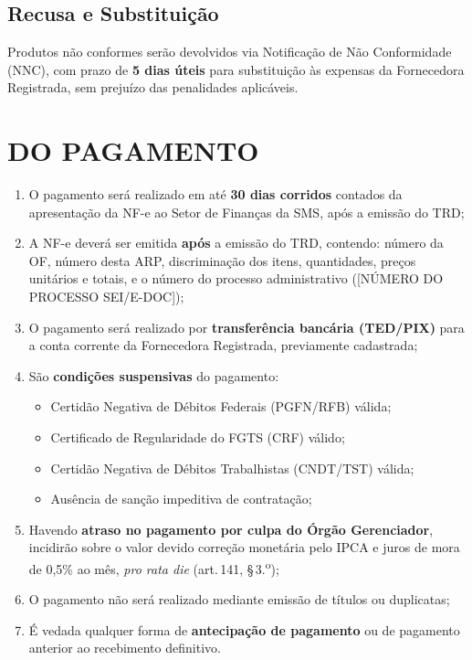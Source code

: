 \documentclass[12pt,a4paper]{article}
\newcommand{\art}[1]{art.\,#1}
\newcommand{\procNum}{[NÚMERO DO PROCESSO SEI/E-DOC]}
\begin{document}
\subsection{Recusa e Substituição}

Produtos não conformes serão devolvidos via Notificação de Não Conformidade (NNC),
com prazo de \textbf{5 dias úteis} para substituição às expensas da Fornecedora
Registrada, sem prejuízo das penalidades aplicáveis.

\section{DO PAGAMENTO}

\begin{legalbox}[\art{141}, Lei n.\textsuperscript{o} 14.133/2021]
\small
\end{legalbox}

\begin{enumerate}
  \item O pagamento será realizado em até \textbf{30 dias corridos} contados da
    apresentação da NF-e ao Setor de Finanças da SMS, após a emissão do TRD;

  \item A NF-e deverá ser emitida \textbf{após} a emissão do TRD, contendo:
    número da OF, número desta ARP, discriminação dos itens, quantidades, preços
    unitários e totais, e o número do processo administrativo (\procNum);

  \item O pagamento será realizado por \textbf{transferência bancária (TED/PIX)}
    para a conta corrente da Fornecedora Registrada, previamente cadastrada;

  \item São \textbf{condições suspensivas} do pagamento:
    \begin{itemize}
      \item Certidão Negativa de Débitos Federais (PGFN/RFB) válida;
      \item Certificado de Regularidade do FGTS (CRF) válido;
      \item Certidão Negativa de Débitos Trabalhistas (CNDT/TST) válida;
      \item Ausência de sanção impeditiva de contratação;
    \end{itemize}

  \item Havendo \textbf{atraso no pagamento por culpa do Órgão Gerenciador},
    incidirão sobre o valor devido correção monetária pelo IPCA e juros de mora
    de 0,5\% ao mês, \textit{pro rata die} (\art{141},
    \S\,3.\textsuperscript{o});

  \item O pagamento não será realizado mediante emissão de títulos ou duplicatas;

  \item É vedada qualquer forma de \textbf{antecipação de pagamento} ou de
    pagamento anterior ao recebimento definitivo.
\end{enumerate}
\end{document}

